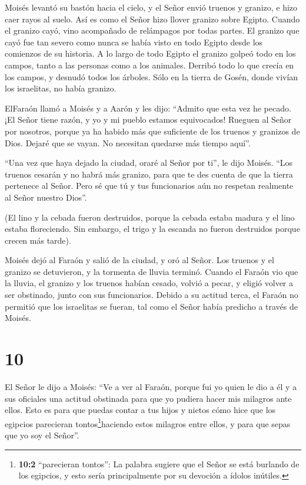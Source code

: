  Moisés levantó su bastón hacia el cielo, y el Señor envió
truenos y granizo, e hizo caer rayos al suelo. Así es como el Señor hizo
llover granizo sobre Egipto.  Cuando el granizo cayó, vino
acompañado de relámpagos por todas partes. El granizo que cayó fue tan
severo como nunca se había visto en todo Egipto desde los comienzos de
su historia.  A lo largo de todo Egipto el granizo golpeó
todo en los campos, tanto a las personas como a los animales. Derribó
todo lo que crecía en los campos, y desnudó todos los árboles.
 Sólo en la tierra de Gosén, donde vivían los israelitas,
no había granizo.

 ElFaraón llamó a Moisés y a Aarón y les dijo: ``Admito que
esta vez he pecado. ¡El Señor tiene razón, y yo y mi pueblo estamos
equivocados!  Rueguen al Señor por nosotros, porque ya ha
habido más que suficiente de los truenos y granizos de Dios. Dejaré que
se vayan. No necesitan quedarse más tiempo aquí''.

 ``Una vez que haya dejado la ciudad, oraré al Señor por
ti'', le dijo Moisés. ``Los truenos cesarán y no habrá más granizo, para
que te des cuenta de que la tierra pertenece al Señor. 
Pero sé que tú y tus funcionarios aún no respetan realmente al Señor
nuestro Dios''.

 (El lino y la cebada fueron destruidos, porque la cebada
estaba madura y el lino estaba floreciendo.  Sin embargo,
el trigo y la escanda no fueron destruidos porque crecen más tarde).

 Moisés dejó al Faraón y salió de la ciudad, y oró al
Señor. Los truenos y el granizo se detuvieron, y la tormenta de lluvia
terminó.  Cuando el Faraón vio que la lluvia, el granizo y
los truenos habían cesado, volvió a pecar, y eligió volver a ser
obstinado, junto con sus funcionarios.  Debido a su actitud
terca, el Faraón no permitió que los israelitas se fueran, tal como el
Señor había predicho a través de Moisés.

\hypertarget{section-9}{%
\section{10}\label{section-9}}

 El Señor le dijo a Moisés: ``Ve a ver al Faraón, porque fui
yo quien le dio a él y a sus oficiales una actitud obstinada para que yo
pudiera hacer mis milagros ante ellos.  Esto es para que
puedas contar a tus hijos y nietos cómo hice que los egipcios parecieran
tontos\footnote{\textbf{10:2} ``parecieran tontos'': La palabra sugiere
  que el Señor se está burlando de los egipcios, y esto sería
  principalmente por su devoción a ídolos inútiles.}haciendo estos
milagros entre ellos, y para que sepas que yo soy el Señor''.

